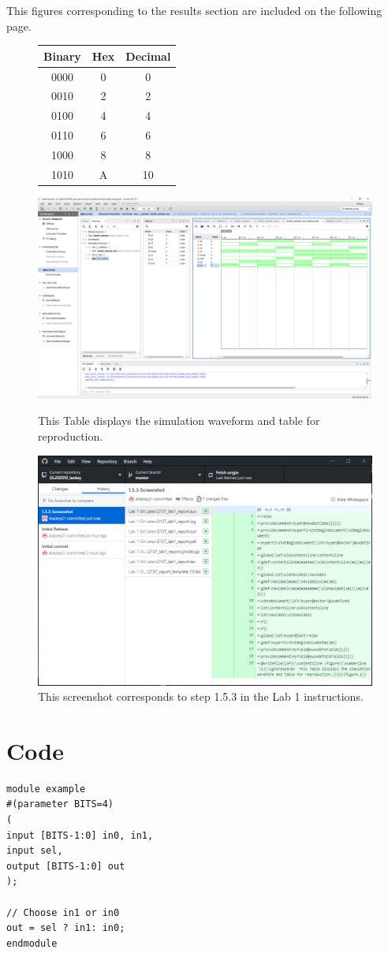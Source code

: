 \documentclass[11pt]{article}
\begin{document}
This figures corresponding to the results section are included on the following page.
\begin{figure}[ht]\centering
	\begin{tabular}{c|c|c}
		\toprule
		Binary & Hex & Decimal \\
		\midrule
		0000 & 0 & 0 \\
		0010 & 2 & 2 \\
		0100 & 4 & 4 \\
		0110 & 6 & 6 \\
		1000 & 8 & 8 \\
		1010 & A & 10 \\
		\bottomrule
	\end{tabular} 
	
	\includegraphics[scale=0.75, trim=18.5cm 15.5cm 0.5cm 4.5cm, clip]{lab1_example_screenshot}	
	\caption{ This Table displays the simulation waveform and table for reproduction.}
	\includegraphics[scale=0.60]{Screenshot}	
	\caption{ This screenshot corresponds to step 1.5.3 in the Lab 1 instructions.}
\end{figure}

\clearpage
\section*{Code}


\begin{lstlisting}[style=Verilog,
caption=Direct Verilog code example,
label=code:ex 
]
module example
#(parameter BITS=4)
(
input [BITS-1:0] in0, in1,
input sel,
output [BITS-1:0] out
);

// Choose in1 or in0
out = sel ? in1: in0; 
endmodule
\end{lstlisting}
\end{document}
